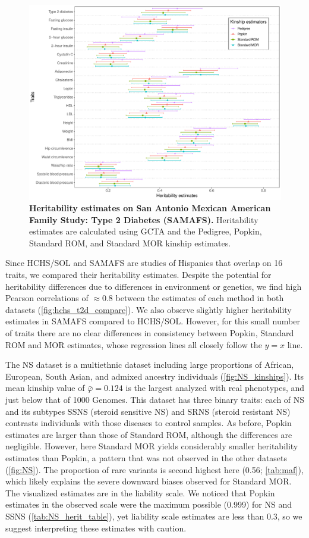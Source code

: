 \documentclass[11pt]{article}
\begin{document}
\begin{figure}[bp!]
  \centering
  \includegraphics[width=\textwidth]{data/Fig2_T2D_maf001_agesex.pdf}
  \caption{
    {\bf Heritability estimates on San Antonio Mexican American Family Study: Type 2 Diabetes (SAMAFS).}
    Heritability estimates are calculated using GCTA and the Pedigree, Popkin, Standard ROM, and Standard MOR kinship estimates.
    }
  \label{fig:T2D}
\end{figure}

Since HCHS/SOL and SAMAFS are studies of Hispanics that overlap on 16 traits, we compared their heritability estimates.
Despite the potential for heritability differences due to differences in environment or genetics, we find high Pearson correlations of $\approx 0.8$ between the estimates of each method in both datasets (\cref{fig:hchs_t2d_compare}).
We also observe slightly higher heritability estimates in SAMAFS compared to HCHS/SOL.
However, for this small number of traits there are no clear differences in consistency between Popkin, Standard ROM and MOR estimates, whose regression lines all closely follow the $y=x$ line.

The NS dataset is a multiethnic dataset including large proportions of African, European, South Asian, and admixed ancestry individuals (\cref{fig:NS_kinships}).
Its mean kinship value of $\bar{\varphi} = 0.124$ is the largest analyzed with real phenotypes, and just below that of 1000 Genomes.
This dataset has three binary traits: each of NS and its subtypes SSNS (steroid sensitive NS) and SRNS (steroid resistant NS) contrasts individuals with those diseases to control samples.
As before, Popkin estimates are larger than those of Standard ROM, although the differences are negligible.
However, here Standard MOR yields considerably smaller heritability estimates than Popkin, a pattern that was not observed in the other datasets (\cref{fig:NS}).
The proportion of rare variants is second highest here (0.56; \cref{tab:maf}), which likely explains the severe downward biases observed for Standard MOR.
The visualized estimates are in the liability scale.
We noticed that Popkin estimates in the observed scale were the maximum possible (0.999) for NS and SSNS (\cref{tab:NS_herit_table}), yet liability scale estimates are less than 0.3, so we suggest interpreting these estimates with caution.
\end{document}
